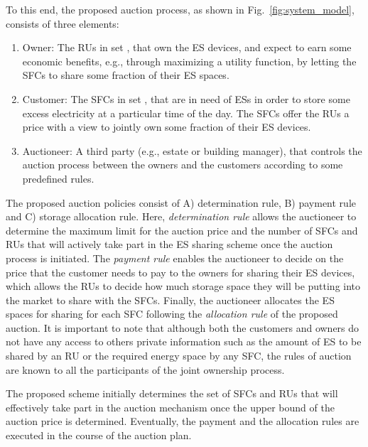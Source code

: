 \documentclass[journal,10pt]{IEEEtran}
\begin{document}
To this end, the proposed auction process, as shown in Fig.~\ref{fig:system_model}, consists of three elements:
\begin{enumerate}
\item Owner: The RUs in set , that own the ES devices, and expect to earn some economic benefits, e.g., through maximizing a utility function, by letting the SFCs to share some fraction of their ES spaces.
\item Customer: The SFCs in set , that are in need of ESs in order to store some excess electricity at a particular time of the day. The SFCs offer the RUs a price with a view to jointly own some fraction of their ES devices.
\item Auctioneer: A third party (e.g., estate or building manager), that controls the auction process between the owners and the customers according to some predefined rules.
\end{enumerate}
The proposed auction policies consist of A) determination rule, B) payment rule and C) storage allocation rule. Here, \emph{determination rule} allows the auctioneer to determine the maximum limit for the auction price  and the number of SFCs and RUs that will actively take part in the ES sharing scheme once the auction process is initiated. The \emph{payment rule} enables the auctioneer to decide on the price that the customer needs to pay to the owners for sharing their ES devices, which allows the RUs to decide how much storage space they will be putting into the market to share with the SFCs. Finally, the auctioneer allocates the ES spaces for sharing for each SFC following the \emph{allocation rule} of the proposed auction. It is important to note that although both the customers and owners do not have any access to others private information such as the amount of ES to be shared by an RU or the required energy space by any SFC, the rules of auction are known to all the participants of the joint ownership process.

The proposed scheme initially determines the set of SFCs  and RUs  that will effectively take part in the auction mechanism once the upper bound of the auction price  is determined. Eventually, the payment and the allocation rules are executed in the course of the auction plan.
\end{document}
